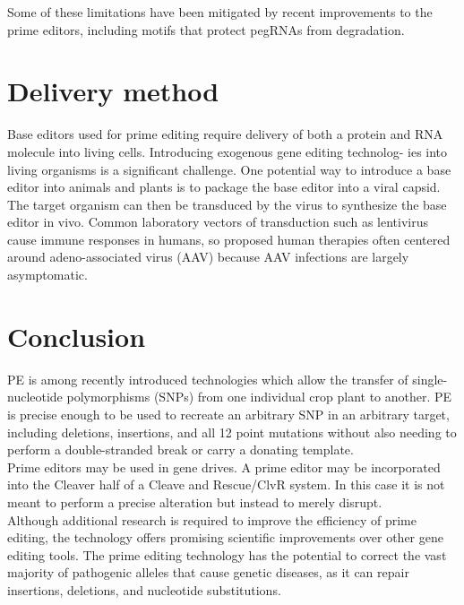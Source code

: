\documentclass[a4paper,12pt]{extarticle}
\begin{document}
Some of these limitations have been mitigated by recent improvements to the prime editors, including motifs that protect pegRNAs from degradation.\\

\section{Delivery method}

Base editors used for prime editing require delivery of both a protein and RNA molecule into living cells. Introducing exogenous gene editing technolog- ies into living organisms is a significant challenge. One potential way to introduce a base editor into animals and plants is to package the base editor into a viral capsid. The target organism can then be transduced by the virus to synthesize the base editor in vivo. Common laboratory vectors of transduction such as lentivirus cause immune responses in humans, so proposed human therapies often centered around adeno-associated virus (AAV) because AAV infections are largely asymptomatic.

\section{Conclusion}

PE is among recently introduced technologies which allow the transfer of single-nucleotide polymorphisms (SNPs) from one individual crop plant to another. PE is precise enough to be used to recreate an arbitrary SNP in an arbitrary target, including deletions, insertions, and all 12 point mutations without also needing to perform a double-stranded break or carry a donating template.\\

Prime editors may be used in gene drives. A prime editor may be incorporated into the Cleaver half of a Cleave and Rescue/ClvR system. In this case it is not meant to perform a precise alteration but instead to merely disrupt.\\

Although additional research is required to improve the efficiency of prime editing, the technology offers promising scientific improvements over other gene editing tools. The prime editing technology has the potential to correct the vast majority of pathogenic alleles that cause genetic diseases, as it can repair insertions, deletions, and nucleotide substitutions.

\pagebreak
\end{document}
